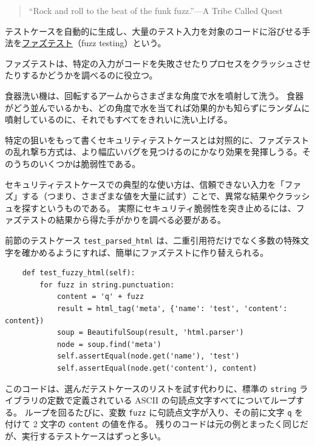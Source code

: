 \documentclass[uplatex]{jsarticle}
\def\label#1{}%
\begin{document}
\begin{quote}
“Rock and roll to the beat of the funk fuzz.”\hfill ---A Tribe Called Quest
\end{quote}

\begin{dfn}[ファズテスト]\label{dfn:ch12-fuzz-testing}
テストケースを自動的に生成し、大量のテスト入力を対象のコードに浴びせる手法を\underline{ファズテスト}（fuzz testing）という。
\end{dfn}

ファズテストは、特定の入力がコードを失敗させたりプロセスをクラッシュさせたりするかどうかを調べるのに役立つ。

\begin{exa}[食器洗い機のたとえ]\label{exa:ch12-dishwasher}
食器洗い機は、回転するアームからさまざまな角度で水を噴射して洗う。
食器がどう並んでいるかも、どの角度で水を当てれば効果的かも知らずにランダムに噴射しているのに、それでもすべてをきれいに洗い上げる。
\end{exa}

特定の狙いをもって書くセキュリティテストケースとは対照的に、ファズテストの乱れ撃ち方式は、より幅広いバグを見つけるのにかなり効果を発揮しうる。そのうちのいくつかは脆弱性である。

セキュリティテストケースでの典型的な使い方は、信頼できない入力を「ファズ」する（つまり、さまざまな値を大量に試す）ことで、異常な結果やクラッシュを探すというものである。
実際にセキュリティ脆弱性を突き止めるには、ファズテストの結果から得た手がかりを調べる必要がある。

前節のテストケース \texttt{test\_parsed\_html} は、二重引用符だけでなく多数の特殊文字を確かめるようにすれば、簡単にファズテストに作り替えられる。

\begin{exa}\label{exa:ch12-fuzzy-html}
\begin{verbatim}
    def test_fuzzy_html(self):
        for fuzz in string.punctuation:
            content = 'q' + fuzz
            result = html_tag('meta', {'name': 'test', 'content': content})
            soup = BeautifulSoup(result, 'html.parser')
            node = soup.find('meta')
            self.assertEqual(node.get('name'), 'test')
            self.assertEqual(node.get('content'), content)
\end{verbatim}
\end{exa}

このコードは、選んだテストケースのリストを試す代わりに、標準の \texttt{string} ライブラリの定数で定義されている ASCII の句読点文字すべてについてループする。
ループを回るたびに、変数 \texttt{fuzz} に句読点文字が入り、その前に文字 \texttt{q} を付けて 2 文字の \texttt{content} の値を作る。
残りのコードは元の例とまったく同じだが、実行するテストケースはずっと多い。
\end{document}

